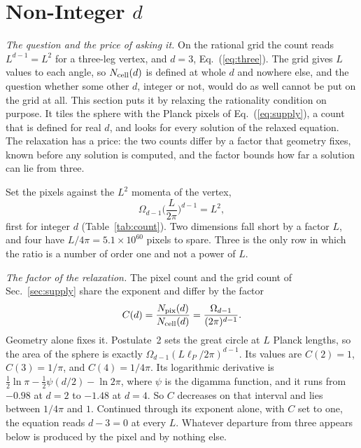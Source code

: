 \documentclass[aps,prd,twocolumn,superscriptaddress,nofootinbib]{revtex4-2}
\begin{document}
\section{Non-Integer $d$}
\label{sec:root}

\textit{The question and the price of asking it.} On the rational grid the count reads $L^{d-1} = L^2$ for a three-leg vertex, and $d = 3$, Eq.~(\ref{eq:three}). The grid gives $L$ values to each angle, so $N_{\rm cell}(d)$ is defined at whole $d$ and nowhere else, and the question whether some other $d$, integer or not, would do as well cannot be put on the grid at all. This section puts it by relaxing the rationality condition on purpose. It tiles the sphere with the Planck pixels of Eq.~(\ref{eq:supply}), a count that is defined for real $d$, and looks for every solution of the relaxed equation. The relaxation has a price: the two counts differ by a factor that geometry fixes, known before any solution is computed, and the factor bounds how far a solution can lie from three.

Set the pixels against the $L^2$ momenta of the vertex,
\begin{equation}
\Omega_{d-1}\Big(\frac{L}{2\pi}\Big)^{d-1} = L^2 ,
\label{eq:match}
\end{equation}
first for integer $d$ (Table~\ref{tab:count}). Two dimensions fall short by a factor $L$, and four have $L/4\pi = 5.1\times10^{60}$ pixels to spare. Three is the only row in which the ratio is a number of order one and not a power of $L$.

\textit{The factor of the relaxation.} The pixel count and the grid count of Sec.~\ref{sec:supply} share the exponent and differ by the factor
\begin{equation}
C(d) = \frac{N_{\rm pix}(d)}{N_{\rm cell}(d)} = \frac{\Omega_{d-1}}{(2\pi)^{d-1}} .
\label{eq:C}
\end{equation}
Geometry alone fixes it. Postulate~2 sets the great circle at $L$ Planck lengths, so the area of the sphere is exactly $\Omega_{d-1}(L\ell_P/2\pi)^{d-1}$. Its values are $C(2) = 1$, $C(3) = 1/\pi$, and $C(4) = 1/4\pi$. Its logarithmic derivative is $\tfrac12\ln\pi - \tfrac12\psi(d/2) - \ln 2\pi$, where $\psi$ is the digamma function, and it runs from $-0.98$ at $d = 2$ to $-1.48$ at $d = 4$. So $C$ decreases on that interval and lies between $1/4\pi$ and $1$. Continued through its exponent alone, with $C$ set to one, the equation reads $d - 3 = 0$ at every $L$. Whatever departure from three appears below is produced by the pixel and by nothing else.
\end{document}
